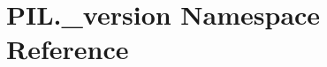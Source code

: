 \hypertarget{namespacePIL_1_1__version}{}\section{P\+I\+L.\+\_\+version Namespace Reference}
\label{namespacePIL_1_1__version}
